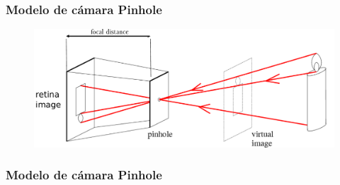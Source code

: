 \begin{frame}
    \frametitle{Modelo de cámara Pinhole}
    
    \begin{figure}[!h]
        \includegraphics[width=0.6\columnwidth]{images/pinhole_camera_virtual_image.pdf}
    \end{figure}   
\end{frame}

\begin{frame}
    \frametitle{Modelo de cámara Pinhole}
    \begin{figure}[!h]
    \centering
\end{figure}

\end{frame}


